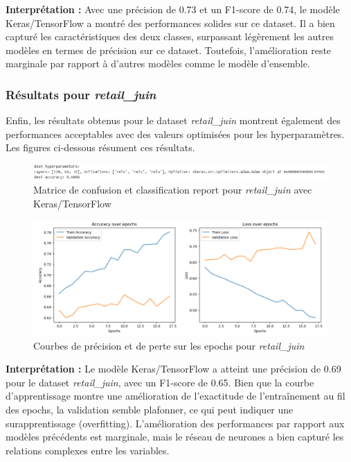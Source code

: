 \textbf{Interprétation :} Avec une précision de 0.73 et un F1-score de 0.74, le modèle Keras/TensorFlow a montré des performances solides sur ce dataset. Il a bien capturé les caractéristiques des deux classes, surpassant légèrement les autres modèles en termes de précision sur ce dataset. Toutefois, l'amélioration reste marginale par rapport à d'autres modèles comme le modèle d'ensemble.

\subsubsection{Résultats pour \textit{retail\_juin}}

Enfin, les résultats obtenus pour le dataset \textit{retail\_juin} montrent également des performances acceptables avec des valeurs optimisées pour les hyperparamètres. Les figures ci-dessous résument ces résultats.

\begin{figure}[H]
    \centering
    \includegraphics[width=0.8\linewidth]{capture_modele_30.png}
    \caption{Matrice de confusion et classification report pour \textit{retail\_juin} avec Keras/TensorFlow}
\end{figure}

\begin{figure}[H]
    \centering
    \includegraphics[width=0.8\linewidth]{capture_modele_31.png}
    \caption{Courbes de précision et de perte sur les epochs pour \textit{retail\_juin}}
    \label{fig:curves_juin_keras}
\end{figure}

\textbf{Interprétation :} Le modèle Keras/TensorFlow a atteint une précision de 0.69 pour le dataset \textit{retail\_juin}, avec un F1-score de 0.65. Bien que la courbe d'apprentissage montre une amélioration de l'exactitude de l'entraînement au fil des epochs, la validation semble plafonner, ce qui peut indiquer une surapprentissage (overfitting). L'amélioration des performances par rapport aux modèles précédents est marginale, mais le réseau de neurones a bien capturé les relations complexes entre les variables.

